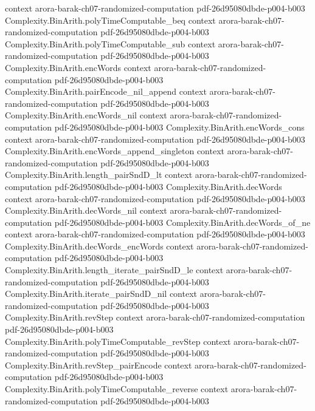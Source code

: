 \begin{theorem}
  {context}
  {arora-barak-ch07-randomized-computation}
  {pdf-26d95080dbde-p004-b003}
\proofstep
  {Complexity.BinArith.polyTimeComputable_beq}
  {context}
  {arora-barak-ch07-randomized-computation}
  {pdf-26d95080dbde-p004-b003}
\proofstep
  {Complexity.BinArith.polyTimeComputable_sub}
  {context}
  {arora-barak-ch07-randomized-computation}
  {pdf-26d95080dbde-p004-b003}
\proofstep
  {Complexity.BinArith.encWords}
  {context}
  {arora-barak-ch07-randomized-computation}
  {pdf-26d95080dbde-p004-b003}
\proofstep
  {Complexity.BinArith.pairEncode_nil_append}
  {context}
  {arora-barak-ch07-randomized-computation}
  {pdf-26d95080dbde-p004-b003}
\proofstep
  {Complexity.BinArith.encWords_nil}
  {context}
  {arora-barak-ch07-randomized-computation}
  {pdf-26d95080dbde-p004-b003}
\proofstep
  {Complexity.BinArith.encWords_cons}
  {context}
  {arora-barak-ch07-randomized-computation}
  {pdf-26d95080dbde-p004-b003}
\proofstep
  {Complexity.BinArith.encWords_append_singleton}
  {context}
  {arora-barak-ch07-randomized-computation}
  {pdf-26d95080dbde-p004-b003}
\proofstep
  {Complexity.BinArith.length_pairSndD_lt}
  {context}
  {arora-barak-ch07-randomized-computation}
  {pdf-26d95080dbde-p004-b003}
\proofstep
  {Complexity.BinArith.decWords}
  {context}
  {arora-barak-ch07-randomized-computation}
  {pdf-26d95080dbde-p004-b003}
\proofstep
  {Complexity.BinArith.decWords_nil}
  {context}
  {arora-barak-ch07-randomized-computation}
  {pdf-26d95080dbde-p004-b003}
\proofstep
  {Complexity.BinArith.decWords_of_ne}
  {context}
  {arora-barak-ch07-randomized-computation}
  {pdf-26d95080dbde-p004-b003}
\proofstep
  {Complexity.BinArith.decWords_encWords}
  {context}
  {arora-barak-ch07-randomized-computation}
  {pdf-26d95080dbde-p004-b003}
\proofstep
  {Complexity.BinArith.length_iterate_pairSndD_le}
  {context}
  {arora-barak-ch07-randomized-computation}
  {pdf-26d95080dbde-p004-b003}
\proofstep
  {Complexity.BinArith.iterate_pairSndD_nil}
  {context}
  {arora-barak-ch07-randomized-computation}
  {pdf-26d95080dbde-p004-b003}
\proofstep
  {Complexity.BinArith.revStep}
  {context}
  {arora-barak-ch07-randomized-computation}
  {pdf-26d95080dbde-p004-b003}
\proofstep
  {Complexity.BinArith.polyTimeComputable_revStep}
  {context}
  {arora-barak-ch07-randomized-computation}
  {pdf-26d95080dbde-p004-b003}
\proofstep
  {Complexity.BinArith.revStep_pairEncode}
  {context}
  {arora-barak-ch07-randomized-computation}
  {pdf-26d95080dbde-p004-b003}
\proofstep
  {Complexity.BinArith.polyTimeComputable_reverse}
  {context}
  {arora-barak-ch07-randomized-computation}
  {pdf-26d95080dbde-p004-b003}

\end{theorem}
